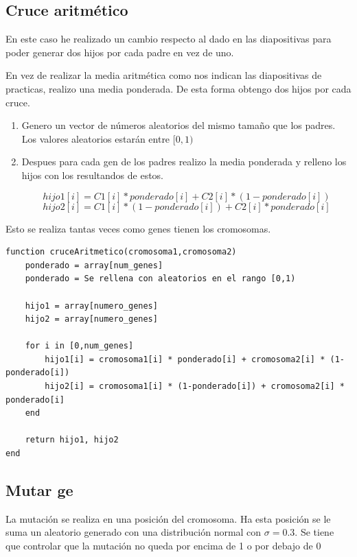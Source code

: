 \documentclass[titlepage]{article}
\begin{document}
	\subsection{Cruce aritmético}
	
	En este caso he realizado un cambio respecto al dado en las diapositivas para poder generar dos hijos por cada padre en vez de uno.
	
	En vez de realizar la media aritmética como nos indican las diapositivas de practicas, realizo una media ponderada. De esta forma obtengo dos hijos por cada cruce.
	
	\begin{enumerate}
		\item Genero un vector de números aleatorios del mismo tamaño que los padres. Los valores aleatorios estarán entre $[0,1)$
		
		\item Despues para cada gen de los padres realizo la media ponderada y relleno los hijos con los resultandos de estos.
		
		$$
		hijo1[i] = C1[i] * ponderado[i] + C2[i] * (1-ponderado[i])
		$$
		$$
		hijo2[i] = C1[i] * (1-ponderado[i]) + C2[i] * ponderado[i]
		$$
		
		
	\end{enumerate} 
	Esto se realiza tantas veces como genes tienen los cromosomas.
	
	
	
	\begin{lstlisting}
function cruceAritmetico(cromosoma1,cromosoma2)
	ponderado = array[num_genes]
	ponderado = Se rellena con aleatorios en el rango [0,1)
	
	hijo1 = array[numero_genes]
	hijo2 = array[numero_genes]	
	
	for i in [0,num_genes]
		hijo1[i] = cromosoma1[i] * ponderado[i] + cromosoma2[i] * (1-ponderado[i])
		hijo2[i] = cromosoma1[i] * (1-ponderado[i]) + cromosoma2[i] * ponderado[i]
	end
	
	return hijo1, hijo2
end
	\end{lstlisting}
	
	\subsection{Mutar ge}
	La mutación se realiza en una posición del cromosoma. Ha esta posición se le suma un aleatorio generado con una distribución normal con $\sigma = 0.3$. Se tiene que controlar que la mutación no queda por encima de 1 o por debajo de 0
	
\end{document}
